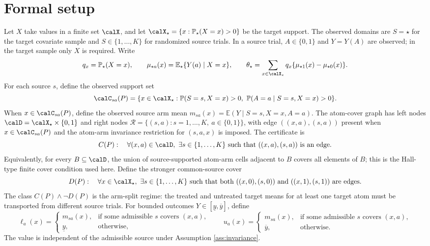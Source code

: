 \documentclass[11pt]{article}
\newcommand{\E}{\mathbb{E}}
\renewcommand{\Pr}{\mathbb{P}}
\newcommand{\calR}{\mathcal{R}}
\theoremstyle{definition}
\theoremstyle{plain}
\theoremstyle{remark}
\begin{document}
\section{Formal setup}
Let $X$ take values in a finite set $\calX$, and let $\calX_\star=\{x:\Pr_\star(X=x)>0\}$ be the target support. The observed domains are $S=\star$ for the target covariate sample and $S\in\{1,\ldots,K\}$ for randomized source trials. In a source trial, $A\in\{0,1\}$ and $Y=Y(A)$ are observed; in the target sample only $X$ is required. Write
\[
q_x=\Pr_\star(X=x),\qquad
\mu_{\star a}(x)=\E_\star\{Y(a)\mid X=x\},\qquad
\theta_\star=\sum_{x\in\calX_\star}q_x\{\mu_{\star 1}(x)-\mu_{\star 0}(x)\}.
\]
For each source $s$, define the observed support set
\[
\calC_{sa}(P)=\{x\in\calX_\star:\Pr(S=s,X=x)>0,\ \Pr(A=a\mid S=s,X=x)>0\}.
\]
When $x\in\calC_{sa}(P)$, define the observed source arm mean $m_{sa}(x)=\E(Y\mid S=s,X=x,A=a)$. The atom-cover graph has left nodes $\calD=\calX_\star\times\{0,1\}$ and right nodes $\calR=\{(s,a):s=1,\ldots,K,\ a\in\{0,1\}\}$, with edge $((x,a),(s,a))$ present when $x\in\calC_{sa}(P)$ and the atom-arm invariance restriction for $(s,a,x)$ is imposed. The certificate is
\[
C(P):\quad \forall (x,a)\in\calD,\ \exists s\in\{1,\ldots,K\}\text{ such that }((x,a),(s,a))\text{ is an edge.}
\]
Equivalently, for every $B\subseteq\calD$, the union of source-supported atom-arm cells adjacent to $B$ covers all elements of $B$; this is the Hall-type finite cover condition used here. Define the stronger common-source cover
\[
D(P):\quad \forall x\in\calX_\star,\ \exists s\in\{1,\ldots,K\}\text{ such that both }((x,0),(s,0))\text{ and }((x,1),(s,1))\text{ are edges.}
\]
The class $C(P)\wedge\neg D(P)$ is the arm-split regime: the treated and untreated target means for at least one target atom must be transported from different source trials. For bounded outcomes $Y\in[\underline y,\overline y]$, define
\[
\ell_a(x)=
\begin{cases}
m_{sa}(x), & \text{if some admissible }s\text{ covers }(x,a),\\
\underline y, & \text{otherwise,}
\end{cases}
\qquad
u_a(x)=
\begin{cases}
m_{sa}(x), & \text{if some admissible }s\text{ covers }(x,a),\\
\overline y, & \text{otherwise.}
\end{cases}
\]
The value is independent of the admissible source under Assumption \ref{ass:invariance}.
\end{document}

